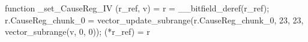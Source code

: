 function _set_CauseReg_IV (r_ref, v) = {
    r = __bitfield_deref(r_ref);
    r.CauseReg_chunk_0 = vector_update_subrange(r.CauseReg_chunk_0, 23, 23, vector_subrange(v, 0, 0));
    (*r_ref) = r
}
